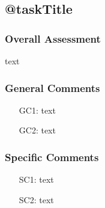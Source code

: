 \subsection{@taskTitle}
\label{task:@label}

\subsubsection*{Overall Assessment}
text

\subsubsection*{General Comments}
\begin{itemize}
    \item[GC1:] text
    \item[GC2:] text
\end{itemize}

\subsubsection*{Specific Comments}
\begin{itemize}
    \item[SC1:] text
    \item[SC2:] text
\end{itemize}

